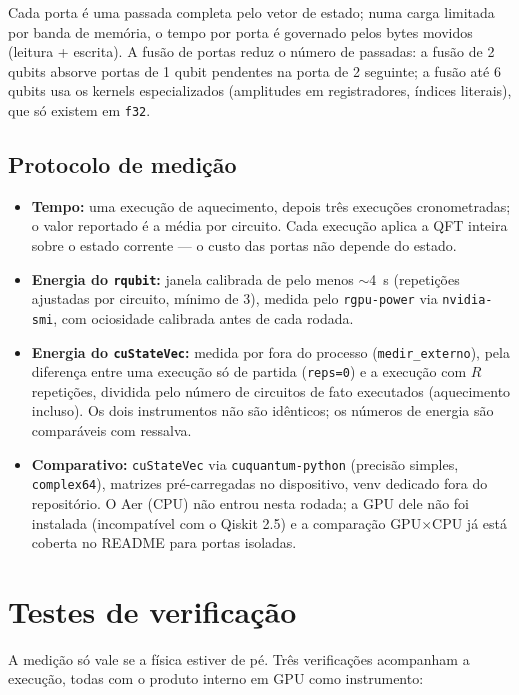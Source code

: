\documentclass[11pt,a4paper]{article}
\begin{document}
Cada porta é uma passada completa pelo vetor de estado; numa carga limitada por
banda de memória, o tempo por porta é governado pelos bytes movidos
(leitura + escrita). A fusão de portas reduz o número de passadas: a fusão de
2 qubits absorve portas de 1 qubit pendentes na porta de 2 seguinte; a fusão
até 6 qubits usa os kernels especializados (amplitudes em registradores,
índices literais), que só existem em \texttt{f32}.

\subsection{Protocolo de medição}

\begin{itemize}
\item \textbf{Tempo:} uma execução de aquecimento, depois três execuções
  cronometradas; o valor reportado é a média por circuito. Cada execução
  aplica a QFT inteira sobre o estado corrente --- o custo das portas não
  depende do estado.
\item \textbf{Energia do \texttt{rqubit}:} janela calibrada de pelo menos
  $\sim$4~s (repetições ajustadas por circuito, mínimo de 3), medida pelo
  \texttt{rgpu-power} via \texttt{nvidia-smi}, com ociosidade calibrada antes
  de cada rodada.
\item \textbf{Energia do \texttt{cuStateVec}:} medida por fora do processo
  (\texttt{medir\_externo}), pela diferença entre uma execução só de partida
  (\texttt{reps=0}) e a execução com $R$ repetições, dividida pelo número de
  circuitos de fato executados (aquecimento incluso). Os dois instrumentos não
  são idênticos; os números de energia são comparáveis com ressalva.
\item \textbf{Comparativo:} \texttt{cuStateVec} via \texttt{cuquantum-python}
  (precisão simples, \texttt{complex64}), matrizes pré-carregadas no
  dispositivo, venv dedicado fora do repositório. O Aer (CPU) não entrou nesta
  rodada; a GPU dele não foi instalada (incompatível com o Qiskit 2.5) e a
  comparação GPU$\times$CPU já está coberta no README para portas isoladas.
\end{itemize}

\section{Testes de verificação}

A medição só vale se a física estiver de pé. Três verificações acompanham a
execução, todas com o produto interno em GPU como instrumento:
\end{document}
